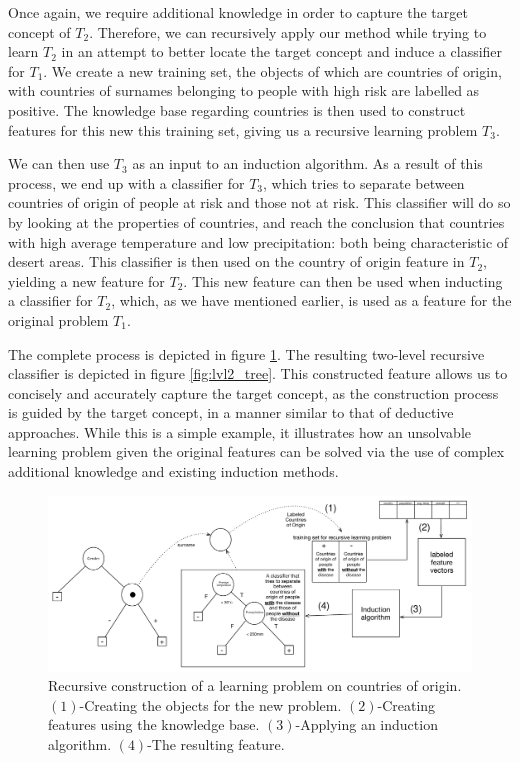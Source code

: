 \documentclass[twoside,11pt]{article}
\theoremstyle{definition}
\begin{document}
Once again, we require additional knowledge in order to capture the target concept of $T_2$. 
Therefore, we can recursively apply our method while trying to learn $T_2$ in an attempt to better locate the target concept and induce a classifier for $T_1$.
We create a new training set, the objects of which are countries of origin, with countries of surnames belonging to people with high risk are labelled as positive. The knowledge base regarding countries is then used to construct features for this new this training set, giving us a recursive learning problem $T_3$.

We can then use $T_3$ as an input to an induction algorithm. As a result of this process, we end up with a classifier for $T_3$, which tries to separate between countries of origin of people at risk and those not at risk. This classifier will do so by looking at the properties of countries, and reach the conclusion that countries with high average temperature and low precipitation: both being characteristic of desert areas.
This classifier is then used on the country of origin feature in $T_2$, yielding a new feature for $T_2$.  This new feature can then be used when inducting a classifier for $T_2$, which, as we have mentioned earlier, is used as a feature for the original problem $T_1$.

The complete process is depicted in figure \ref{fig:moving_to_lvl2}. The resulting two-level recursive classifier is depicted in figure \ref{fig:lvl2_tree}. This constructed feature allows us to concisely and accurately capture the target concept, as the construction process is guided by the target concept, in a manner similar to that of deductive approaches.
While this is a simple example, it illustrates how an unsolvable learning problem given the original features can be solved via the use of complex additional knowledge and existing induction methods.


\begin{figure}[t]
	\centering
	\includegraphics[width=\linewidth]{fig4_annotated.pdf}
	\caption{Recursive construction of a learning problem on countries of origin. $(1)$-Creating the objects for the new problem. $(2)$-Creating features using the knowledge base. $(3)$-Applying an induction algorithm. $(4)$-The resulting feature.}
	\label{fig:moving_to_lvl2}
\end{figure}
\end{document}
